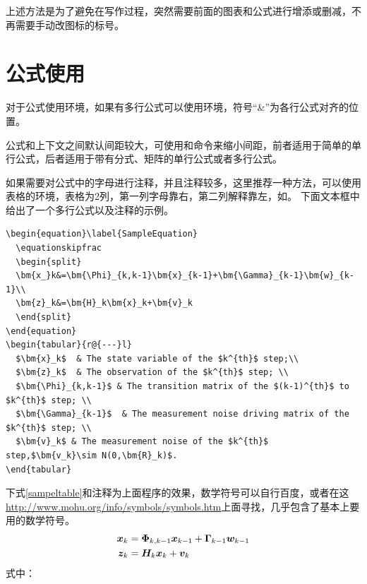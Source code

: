 {\begin{spacing}{1.5}
上述方法是为了避免在写作过程，突然需要前面的图表和公式进行增添或删减，不再需要手动改图标的标号。

\section{公式使用}
对于公式使用环境，如果有多行公式可以使用环境，符号“\&”为各行公式对齐的位置。

公式和上下文之间默认间距较大，可使用和命令来缩小间距，前者适用于简单的单行公式，后者适用于带有分式、矩阵的单行公式或者多行公式。

如果需要对公式中的字母进行注释，并且注释较多，这里推荐一种方法，可以使用表格的环境，表格为2列，第一列字母靠右，第二列解释靠左，如。 
下面文本框中给出了一个多行公式以及注释的示例。

\vspace{-4ex}
\begin{lstlisting}
\begin{equation}\label{SampleEquation}
  \equationskipfrac
  \begin{split}
  \bm{x_}k&=\bm{\Phi}_{k,k-1}\bm{x}_{k-1}+\bm{\Gamma}_{k-1}\bm{w}_{k-1}\\
  \bm{z}_k&=\bm{H}_k\bm{x}_k+\bm{v}_k
  \end{split}
\end{equation}
\begin{tabular}{r@{---}l}
  $\bm{x}_k$  & The state variable of the $k^{th}$ step;\\
  $\bm{z}_k$  & The observation of the $k^{th}$ step; \\
  $\bm{\Phi}_{k,k-1}$ & The transition matrix of the $(k-1)^{th}$ to $k^{th}$ step; \\
  $\bm{\Gamma}_{k-1}$  & The measurement noise driving matrix of the $k^{th}$ step; \\
  $\bm{v}_k$ & The measurement noise of the $k^{th}$ step,$\bm{v_k}\sim N(0,\bm{R}_k)$.
\end{tabular}
\end{lstlisting}
\vspace{-1ex}

下式\ref{sampeltable}和注释为上面程序的效果，数学符号可以自行百度，或者在这\url{http://www.mohu.org/info/symbols/symbols.htm}上面寻找，几乎包含了基本上要用的数学符号。
\begin{equation}\label{SampleEquation}
  \equationskipfrac
  \begin{split}
  \bm{x_}k&=\bm{\Phi}_{k,k-1}\bm{x}_{k-1}+\bm{\Gamma}_{k-1}\bm{w}_{k-1}\\
  \bm{z}_k&=\bm{H}_k\bm{x}_k+\bm{v}_k
  \end{split}
\end{equation}
式中：


\end{spacing}}
